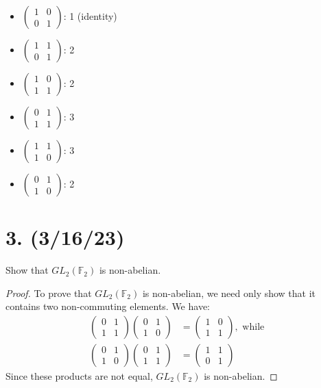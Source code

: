 \documentclass{article}
\begin{document}
\begin{itemize}
    \item $\begin{pmatrix}1 & 0\\0 & 1\end{pmatrix}$: 1 (identity)
    \item $\begin{pmatrix}1 & 1\\0 & 1\end{pmatrix}$: 2
    \item $\begin{pmatrix}1 & 0\\1 & 1\end{pmatrix}$: 2
    \item $\begin{pmatrix}0 & 1\\1 & 1\end{pmatrix}$: 3
    \item $\begin{pmatrix}1 & 1\\1 & 0\end{pmatrix}$: 3
    \item $\begin{pmatrix}0 & 1\\1 & 0\end{pmatrix}$: 2
\end{itemize}

\section*{3. (3/16/23)}

Show that $GL_2(\mathbb{F}_2)$ is non-abelian.

\begin{proof}
    To prove that $GL_2(\mathbb{F}_2)$ is non-abelian, we need only show that it contains two non-commuting elements. We have:
    \begin{align*}
        \begin{pmatrix}0 & 1\\1 & 1\end{pmatrix} \begin{pmatrix}0 & 1\\1 & 0\end{pmatrix} &= \begin{pmatrix}1 & 0\\1 & 1\end{pmatrix}, \text{ while } \\
        \begin{pmatrix}0 & 1\\1 & 0\end{pmatrix} \begin{pmatrix}0 & 1\\1 & 1\end{pmatrix} &= \begin{pmatrix}1 & 1\\0 & 1\end{pmatrix}
    \end{align*}
    Since these products are not equal, $GL_2(\mathbb{F}_2)$ is non-abelian.
\end{proof}
\end{document}
